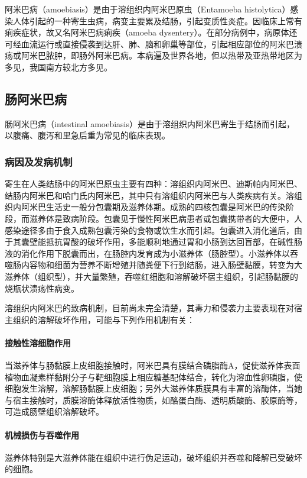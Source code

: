 阿米巴病（amoebiasis）是由于溶组织内阿米巴原虫（Entamoeba
histolytica）感染人体引起的一种寄生虫病，病变主要累及结肠，引起变质性炎症。因临床上常有痢疾症状，故又名阿米巴病痢疾（amoeba
dysentery）。在部分病例中，病原体还可经血流运行或直接侵袭到达肝、肺、脑和卵巢等部位，引起相应部位的阿米巴溃疡或阿米巴脓肿，即肠外阿米巴病。本病遍及世界各地，但以热带及亚热带地区为多见，我国南方较北方多见。

\subsection{肠阿米巴病}

肠阿米巴病（intestinal
amoebiasis）是由于溶组织内阿米巴寄生于结肠而引起，以腹痛、腹泻和里急后重为常见的临床表现。

\subsubsection{病因及发病机制}

寄生在人类结肠中的阿米巴原虫主要有四种：溶组织内阿米巴、迪斯帕内阿米巴、结肠内阿米巴和哈门氏内阿米巴，其中只有溶组织内阿米巴与人类疾病有关。溶组织内阿米巴生活史一般分包囊期及滋养体期。成熟的四核包囊是阿米巴的传染阶段，而滋养体是致病阶段。包囊见于慢性阿米巴病患者或包囊携带者的大便中，人感染途径多由于食入成熟包囊污染的食物或饮生水而引起。包囊进入消化道后，由于其囊壁能抵抗胃酸的破坏作用，多能顺利地通过胃和小肠到达回盲部，在碱性肠液的消化作用下脱囊而出，在肠腔内发育成为小滋养体（肠腔型）。小滋养体以吞噬肠内容物和细菌为营养不断增殖并随粪便下行到结肠，进入肠壁黏膜，转变为大滋养体（组织型），并大量繁殖，吞噬红细胞和溶解破坏宿主组织，引起肠黏膜的烧瓶状溃疡性病变。

溶组织内阿米巴的致病机制，目前尚未完全清楚，其毒力和侵袭力主要表现在对宿主组织的溶解破坏作用，可能与下列作用机制有关：

\paragraph{接触性溶细胞作用}
当滋养体与肠黏膜上皮细胞接触时，阿米巴具有膜结合磷脂酶A，促使滋养体表面植物血凝素样黏附分子与靶细胞膜上相应糖基配体结合，转化为溶血性卵磷脂，使细胞发生溶解，溶解肠黏膜上皮细胞；另外大滋养体质膜具有丰富的溶酶体，当她与宿主接触时，质膜溶酶体释放活性物质，如酪蛋白酶、透明质酸酶、胶原酶等，可造成肠壁组织溶解破坏。

\paragraph{机械损伤与吞噬作用}
滋养体特别是大滋养体能在组织中进行伪足运动，破坏组织并吞噬和降解已受破坏的细胞。

